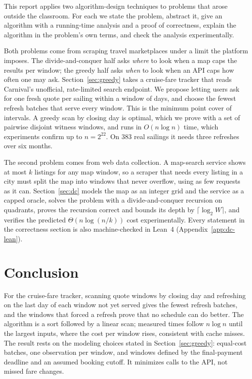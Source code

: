 \documentclass[conference]{IEEEtran}
\theoremstyle{spaced}
\begin{document}
This report applies two algorithm-design techniques to problems that arose
outside the classroom. For each we state the problem, abstract it, give an
algorithm with a running-time analysis and a proof of correctness, explain the
algorithm in the problem's own terms, and check the analysis experimentally.

Both problems come from scraping travel marketplaces under a limit the
platform imposes. The divide-and-conquer half asks \emph{where} to look when a
map caps the results per window; the greedy half asks \emph{when} to look
when an API caps how often one may ask. Section~\ref{sec:greedy} takes a
cruise-fare tracker that reads Carnival's unofficial, rate-limited search
endpoint. We propose letting users ask for one fresh quote per sailing within
a window of days, and choose the fewest refresh batches that serve every
window. This is the minimum point cover of intervals. A greedy scan by
closing day is optimal, which we prove with a set of pairwise disjoint
witness windows, and runs in $O(n\log n)$ time, which experiments confirm up
to $n=2^{22}$. On $383$ real sailings it needs three refreshes over six
months.

The second problem comes from web data collection. A map-search service
shows at most $k$ listings for any map window, so a scraper that needs every
listing in a city must split the map into windows that never overflow, using
as few requests as it can. Section~\ref{sec:dc} models the map as an integer
grid and the service as a capped oracle, solves the problem with a
divide-and-conquer recursion on quadrants, proves the recursion correct and
bounds its depth by $\lceil\log_2 W\rceil$, and verifies the predicted
$\Theta(n\log(n/k))$ cost experimentally. Every statement in the correctness
section is also machine-checked in Lean~4 (Appendix~\ref{app:dc-lean}).





\section{Conclusion}

For the cruise-fare tracker, scanning quote windows by closing day and
refreshing on the last day of each window not yet served gives the fewest
refresh batches, and the windows that forced a refresh prove that no schedule
can do better. The algorithm is a sort followed by a linear scan; measured
times follow $n\log n$ until the largest inputs, where the cost per window
rises, consistent with cache misses. The
result rests on the modeling choices stated in Section~\ref{sec:greedy}:
equal-cost batches, one observation per window, and windows defined by the
final-payment deadline and an assumed booking cutoff. It minimizes calls to
the API, not missed fare changes.
\end{document}
